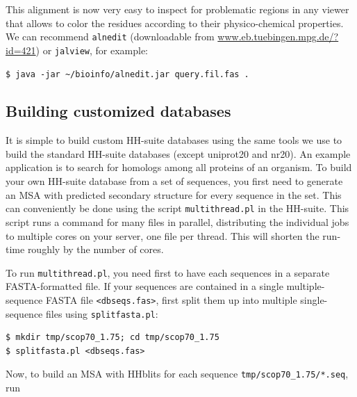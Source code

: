 \documentclass[11pt,a4paper]{article}
\begin{document}
This alignment is now very easy to inspect for problematic regions in any viewer that allows to color the residues according to their physico-chemical properties. We can recommend \verb`alnedit` (downloadable from \url{www.eb.tuebingen.mpg.de/?id=421}) or \verb`jalview`, for example:
\begin{verbatim}
$ java -jar ~/bioinfo/alnedit.jar query.fil.fas .
\end{verbatim}





\subsection{Building customized databases} \label{building_dbs}

It is simple to build custom HH-suite databases using the same tools we use to build the standard HH-suite databases (except uniprot20 and nr20). An example application is to search for homologs among all proteins of an organism. To build your own HH-suite database from a set of sequences, you first need to generate an MSA with predicted secondary structure for every sequence in the set. This can conveniently be done using the script \verb`multithread.pl` in the HH-suite. This script runs a command for many files in parallel, distributing the individual jobs to multiple cores on your server, one file per thread. This will shorten the run-time roughly by the number of cores. 

To run \verb`multithread.pl`, you need first to have each sequences in a separate FASTA-formatted file. If your sequences are contained in a single multiple-sequence FASTA file \verb`<dbseqs.fas>`, first split them up into multiple single-sequence files using \verb`splitfasta.pl`:
\begin{verbatim}
$ mkdir tmp/scop70_1.75; cd tmp/scop70_1.75
$ splitfasta.pl <dbseqs.fas> 
\end{verbatim}
Now, to build an MSA with HHblits for each sequence \verb`tmp/scop70_1.75/*.seq`, run\\[-1mm]
\end{document}
